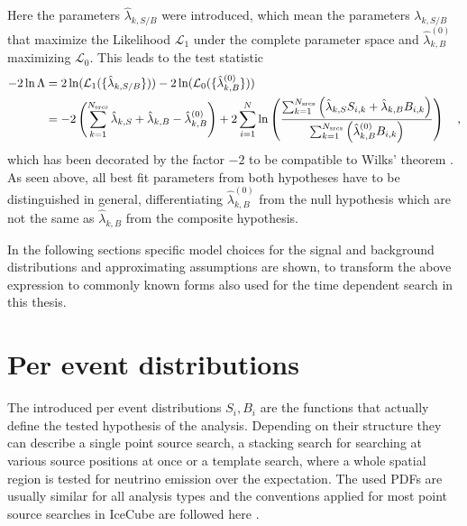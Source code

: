 Here the parameters $\hat{\lambda}_{k,S/B}$ were introduced, which mean the parameters $\lambda_{k,S/B}$ that maximize the Likelihood $\mathcal{L}_1$ under the complete parameter space and $\hat{\lambda}_{k,B}^{(0)}$ maximizing $\mathcal{L}_0$.
This leads to the test statistic
\begin{equation}
  \begin{aligned}
    -2\ln\Lambda
    &= 2\ln(\mathcal{L}_1(\{\hat{\lambda}_{k,S/B}\})) -
       2\ln(\mathcal{L}_0(\{\hat{\lambda}^{(0)}_{k,B}\})) \\
    &= -2\left(\sum_{k=1}^{N_\text{srcs}}\hat{\lambda}_{k,S} +
                                         \hat{\lambda}_{k,B} -
                                         \hat{\lambda}_{k,B}^{(0)}\right) +
      2\sum_{i=1}^N \ln\left(
        \frac{\sum_{k=1}^{N_\text{srcs}}\left(
            \hat{\lambda}_{k,S} S_{i,k}+\hat{\lambda}_{k,B} B_{i,k}\right)}
            {\sum_{k=1}^{N_\text{srcs}}\left(
              \hat{\lambda}_{k,B}^{(0)} B_{i,k}
            \right)}
          \right)
    \quad\text{,}
  \end{aligned}
\end{equation}
which has been decorated by the factor $-2$ to be compatible to Wilks' theorem .
As seen above, all best fit parameters from both hypotheses have to be distinguished in general, differentiating $\hat{\lambda}_{k,B}^{(0)}$ from the null hypothesis which are not the same as $\hat{\lambda}_{k,B}$ from the composite hypothesis.

In the following sections specific model choices for the signal and background distributions and approximating assumptions are shown, to transform the above expression to commonly known forms also used for the time dependent search in this thesis.


\section{Per event distributions}
The introduced per event distributions $S_i, B_i$ are the functions that actually define the tested hypothesis of the analysis.
Depending on their structure they can describe a single point source search, a stacking search for searching at various source positions at once or a template search, where a whole spatial region is tested for neutrino emission over the expectation.
The used PDFs are usually similar for all analysis types and the conventions applied for most point source searches in IceCube are followed here .

